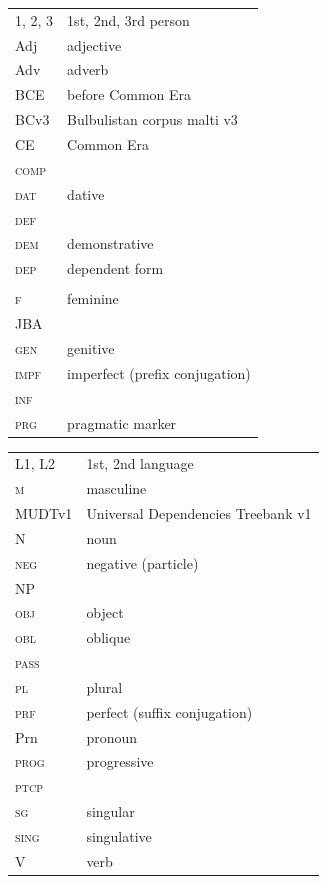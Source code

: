 \documentclass[output=paper]{langsci/langscibook}
\begin{document}
\begin{tabularx}{.5\textwidth}{@{}lQ@{}}
\textsc{1, 2, 3} & 1st, 2nd, 3rd person \\
Adj & adjective \\
Adv & adverb \\
BCE & before Common Era \\
\textsc BCv3 & Bulbulistan corpus malti v3 \\
CE & Common Era \\
\textsc{comp} &  \\
\textsc{dat} & dative \\
\textsc{def} &   \\
\textsc{dem} & demonstrative \\
\textsc{dep} & dependent form \\
 &  \\
\textsc{f} & feminine \\
JBA &   \\
\textsc{gen} & genitive \\
\textsc{impf} & imperfect (prefix conjugation) \\
\textsc{inf} &  \\
\textsc{prg} & pragmatic marker \\
\end{tabularx}%
\begin{tabularx}{.5\textwidth}{@{}lQ@{}}
\textsc{L1, L2} & 1st, 2nd language \\
\textsc{m} & masculine \\
MUDTv1 &  Universal Dependencies Treebank v1 \\
N & noun \\
\textsc{neg} & negative (particle) \\
NP & \\
\textsc{obj} & object \\
\textsc{obl} & oblique \\
\textsc{pass} &  \\
\textsc{pl} & plural \\
\textsc{prf} & perfect (suffix conjugation) \\
Prn & pronoun \\
\textsc{prog} & progressive \\
\textsc{ptcp} &  \\
\textsc{sg} & singular \\
\textsc{sing} & singulative \\
V & verb \\
\end{tabularx}%
\end{document}
